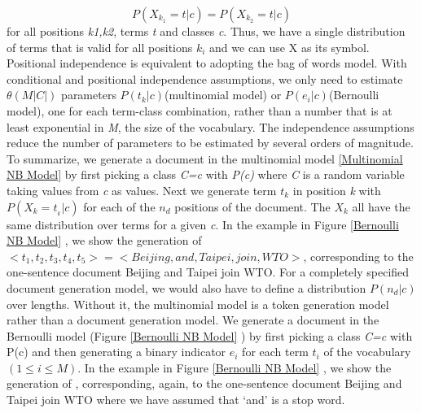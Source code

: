 \documentclass[journal]{IEEEtran}
\begin{document}
\begin{equation}
	P(X_{k_{1}}=t|c)=P(X_{k_{2}}=t|c)
\end{equation}
for all positions \textit{k1,k2}, terms \textit{t} and classes \textit{c}. Thus, we have a single distribution of terms that is valid for all positions $k_{i}$ and we can use X as its symbol. Positional independence is equivalent to adopting the bag of words model.
With conditional and positional independence assumptions, we only need to estimate $\theta(M|C|)$ parameters $P(t_{k}|c)$(multinomial model) or $P(e_{i}|c)$(Bernoulli model), one for each term-class combination, rather than a number that is at least exponential in \textit{M}, the size of the vocabulary. The independence assumptions reduce the number of parameters to be estimated by several orders of magnitude.
To summarize, we generate a document in the multinomial model \ref{Multinomial NB Model} by first picking a class \textit{C=c} with \textit{P(c)} where \textit{C} is a random variable taking values from \textit{c} as values. Next we generate term \textit{$t_{k}$} in position \textit{k} with $P(X_{k}=t_{_{k}}|c)$ for each of the \textit{$ n_{d} $} positions of the document. The \textit{$X_{k}$} all have the same distribution over terms for a given \textit{c}. In the example in Figure \ref{Bernoulli NB Model} , we show the generation of $<t_{1},t_{2},t_{3},t_{4},t_{5}>=<Beijing,and,Taipei,join,WTO>$, corresponding to the one-sentence document Beijing and Taipei join WTO. 
For a completely specified document generation model, we would also have to define a distribution \textit{$P(n_{d}|c)$}
over lengths. Without it, the multinomial model is a token generation model rather than a document generation model. We generate a document in the Bernoulli model (Figure \ref{Bernoulli NB Model} ) by first picking a class \textit{C=c} with P(c) and then generating a binary indicator \textit{$e_{i}$} for each term \textit{$t_{i}$} of the vocabulary $(1\le i \le M)$. In the example in Figure \ref{Bernoulli NB Model} , we show the generation of , corresponding, again, to the one-sentence document Beijing and Taipei join WTO where we have assumed that `and' is a stop word.
\end{document}

